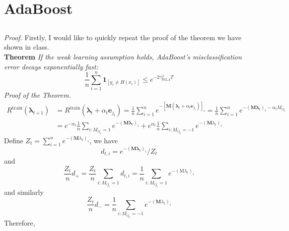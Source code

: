 \documentclass{article}
\begin{document}
\section{AdaBoost}
\subsection{}
\textit{Proof. } Firstly, I would like to quickly repeat the proof of the theorem we have shown in class.\\
\textbf{Theorem } \textit{If the weak learning assumption holds, AdaBoost’s misclassification
error decays exponentially fast:}
\begin{equation}\frac{1}{n} \sum_{i=1}^{n} \mathbf{1}_{\left[y_{i} \neq H\left(x_{i}\right)\right]} \leq e^{-2 \gamma_{W L A}^{2} T}\end{equation}
\textit{Proof of the Theorem. }
\begin{equation}\begin{aligned}
R^{\operatorname{train}}\left(\boldsymbol{\lambda}_{t+1}\right) &=R^{\operatorname{train}}\left(\boldsymbol{\lambda}_{t}+\alpha_{t} \mathbf{e}_{j_{t}}\right)=\frac{1}{n} \sum_{i=1}^{n} e^{-\left[\mathbf{M}\left(\boldsymbol{\lambda}_{t}+\alpha_{t} \mathbf{e}_{j_{t}}\right)\right]_{i}}=\frac{1}{n} \sum_{i=1}^{n} e^{-\left(\mathbf{M} \boldsymbol{\lambda}_{t}\right)_{i}-\alpha_{t} M_{i j_{t}}} \\
&=e^{-\alpha_{t}} \frac{1}{n} \sum_{i: M_{i j_{t}}=1} e^{-\left(\mathbf{M} \boldsymbol{\lambda}_{t}\right)_{i}}+e^{\alpha_{t}} \frac{1}{n} \sum_{i: M_{i j_{t}}=-1} e^{-\left(\mathbf{M} \lambda_{t}\right)_{i}}
\end{aligned}\end{equation}
Define $Z_{t}=\sum_{i=1}^{n} e^{-\left(\mathbf{M} \lambda_{t}\right)_{i}}$, we have
\begin{equation}d_{t, i}=e^{-\left(\mathbf{M} \boldsymbol{\lambda}_{t}\right)_{i}} / Z_{t}\end{equation}
and
\begin{equation}\frac{Z_{t}}{n} d_{+}=\frac{Z_{t}}{n} \sum_{i: M_{i j_{t}}=1} d_{t, i}=\frac{1}{n} \sum_{i: M_{i j_{t}}=1} e^{-\left(\mathrm{M} \lambda_{t}\right)_{i}}\end{equation}
and similarly
\begin{equation}\frac{Z_{t}}{n} d_{-}=\frac{1}{n} \sum_{i: M_{i j_{t}}=-1} e^{-\left(\mathbf{M} \lambda_{t}\right)_{i}}\end{equation}
Therefore,
\end{document}
